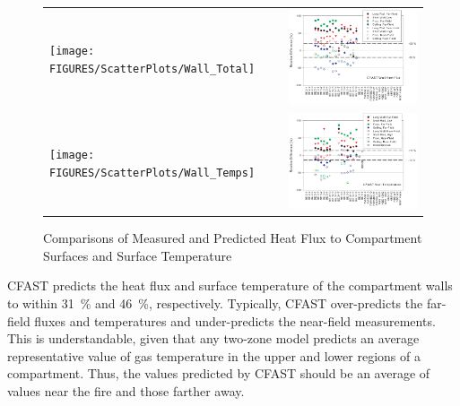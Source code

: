\begin{figure}[p]
\begin{center}
\begin{tabular}{lr}
\texttt{[image: FIGURES/ScatterPlots/Wall\_Total]} & \includegraphics[width=3.5in]{FIGURES/Relative_Diff/Wall_Total} \\
\texttt{[image: FIGURES/ScatterPlots/Wall\_Temps]} & \includegraphics[width=3.5in]{FIGURES/Relative_Diff/Wall_Temps}
\end{tabular}
\end{center}
\caption{Comparisons of Measured and Predicted Heat Flux to Compartment Surfaces and Surface Temperature} \label{fig:Surface_Scatter}
\end{figure}

CFAST predicts the heat flux and surface temperature of the compartment walls to within 31~\% and 46~\%, respectively.  Typically, CFAST over-predicts the far-field fluxes and temperatures and under-predicts the near-field measurements.  This is understandable, given that any two-zone model predicts an average representative value of gas temperature in the upper and lower regions of a compartment.  Thus, the values predicted by CFAST should be an average of values near the fire and those farther away.

